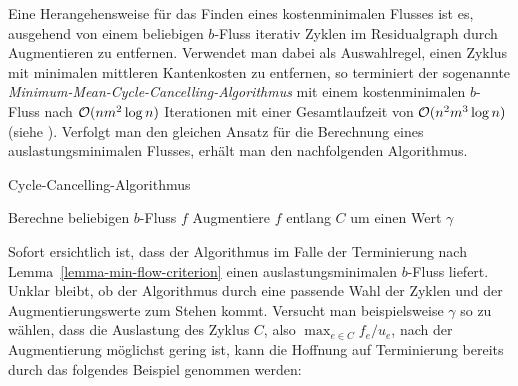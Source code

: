 Eine Herangehensweise für das Finden eines kostenminimalen Flusses ist es, ausgehend von einem beliebigen $b$-Fluss iterativ Zyklen im Residualgraph durch Augmentieren zu entfernen.
Verwendet man dabei als Auswahlregel, einen Zyklus mit minimalen mittleren Kantenkosten zu entfernen, so terminiert der sogenannte \emph{Minimum-Mean-Cycle-Cancelling-Algorithmus} mit einem kostenminimalen $b$-Fluss nach $\mathcal{O}(nm^2\log n)$ Iterationen mit einer Gesamtlaufzeit von $\mathcal{O}(n^2m^3 \log n)$ (siehe \cite[Theoreme~3.9, 3.10]{Goldberg1989}).
Verfolgt man den gleichen Ansatz für die Berechnung eines auslastungsminimalen Flusses, erhält man den nachfolgenden Algorithmus.
\begin{algorithm}
	\caption{Cycle-Cancelling-Algorithmus}
	\label{algorithm-cycle-cancelling}
	\begin{algorithmic}[1]
		\State Berechne beliebigen $b$-Fluss $f$
			\State Augmentiere $f$ entlang $C$ um einen Wert $\gamma$
		\EndWhile
		\EndProcedure
	\end{algorithmic}
\end{algorithm}

Sofort ersichtlich ist, dass der Algorithmus im Falle der Terminierung nach Lemma~\ref{lemma-min-flow-criterion} einen auslastungsminimalen $b$-Fluss liefert.
Unklar bleibt, ob der Algorithmus durch eine passende Wahl der Zyklen und der Augmentierungswerte zum Stehen kommt.
Versucht man beispielsweise $\gamma$ so zu wählen, dass die Auslastung des Zyklus $C$, also $\max_{e\in C} f_e / u_e$, nach der Augmentierung möglichst gering ist, kann die Hoffnung auf Terminierung bereits durch das folgendes Beispiel genommen werden:

